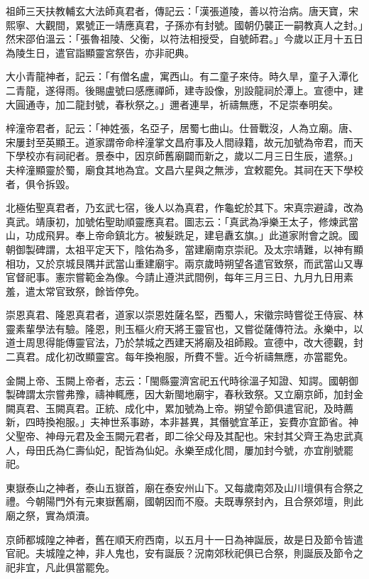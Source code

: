 祖師三天扶教輔玄大法師真君者，傳記云：「漢張道陵，善以符治病。唐天寶，宋熙寧、大觀間，累號正一靖應真君，子孫亦有封號。國朝仍襲正一嗣教真人之封。」然宋邵伯溫云：「張魯祖陵、父衡，以符法相授受，自號師君。」今歲以正月十五日為陵生日，遣官詣顯靈宮祭告，亦非祀典。

大小青龍神者，記云：「有僧名盧，寓西山。有二童子來侍。時久旱，童子入潭化二青龍，遂得雨。後賜盧號曰感應禪師，建寺設像，別設龍祠於潭上。宣德中，建大圓通寺，加二龍封號，春秋祭之。」邇者連旱，祈禱無應，不足崇奉明矣。

梓潼帝君者，記云：「神姓張，名亞子，居蜀七曲山。仕晉戰沒，人為立廟。唐、宋屢封至英顯王。道家謂帝命梓潼掌文昌府事及人間祿籍，故元加號為帝君，而天下學校亦有祠祀者。景泰中，因京師舊廟闢而新之，歲以二月三日生辰，遣祭。」夫梓潼顯靈於蜀，廟食其地為宜。文昌六星與之無涉，宜敕罷免。其祠在天下學校者，俱令拆毀。

北極佑聖真君者，乃玄武七宿，後人以為真君，作龜蛇於其下。宋真宗避諱，改為真武。靖康初，加號佑聖助順靈應真君。圖志云：「真武為凈樂王太子，修煉武當山，功成飛昇。奉上帝命鎮北方。被髮跣足，建皂纛玄旗。」此道家附會之說。國朝御製碑謂，太祖平定天下，陰佑為多，當建廟南京崇祀。及太宗靖難，以神有顯相功，又於京城艮隅并武當山重建廟宇。兩京歲時朔望各遣官致祭，而武當山又專官督祀事。憲宗嘗範金為像。今請止遵洪武間例，每年三月三日、九月九日用素羞，遣太常官致祭，餘皆停免。

崇恩真君、隆恩真君者，道家以崇恩姓薩名堅，西蜀人，宋徽宗時嘗從王侍宸、林靈素輩學法有驗。隆恩，則玉樞火府天將王靈官也，又嘗從薩傳符法。永樂中，以道士周思得能傳靈官法，乃於禁城之西建天將廟及祖師殿。宣德中，改大德觀，封二真君。成化初改顯靈宮。每年換袍服，所費不訾。近今祈禱無應，亦當罷免。

金闕上帝、玉闕上帝者，志云：「閩縣靈濟宮祀五代時徐溫子知證、知諤。國朝御製碑謂太宗嘗弗豫，禱神輒應，因大新閩地廟宇，春秋致祭。又立廟京師，加封金闕真君、玉闕真君。正統、成化中，累加號為上帝。朔望令節俱遣官祀，及時薦新，四時換袍服。」夫神世系事跡，本非甚異，其僭號宜革正，妄費亦宜節省。神父聖帝、神母元君及金玉闕元君者，即二徐父母及其配也。宋封其父齊王為忠武真人，母田氏為仁壽仙妃，配皆為仙妃。永樂至成化間，屢加封今號，亦宜削號罷祀。

東嶽泰山之神者，泰山五嶽首，廟在泰安州山下。又每歲南郊及山川壇俱有合祭之禮。今朝陽門外有元東嶽舊廟，國朝因而不廢。夫既專祭封內，且合祭郊壇，則此廟之祭，實為煩瀆。

京師都城隍之神者，舊在順天府西南，以五月十一日為神誕辰，故是日及節令皆遣官祀。夫城隍之神，非人鬼也，安有誕辰？況南郊秋祀俱已合祭，則誕辰及節令之祀非宜，凡此俱當罷免。

